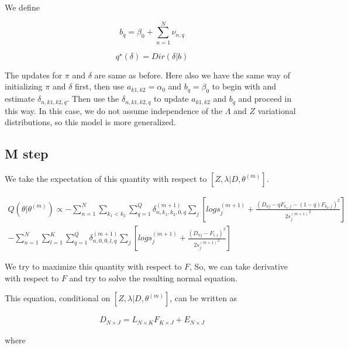 \documentclass[12pt]{article}
\begin{document}
We define 

$$ b_{q} = \beta_0 + \sum_{n=1}^{N} \nu_{n,q} $$

$$ q^{\star} (\delta) = Dir(\delta | b)  $$



The updates for $\pi$ and $\delta$ are same as before. Here also we have the same way of initializing $\pi$ and $\delta$ first, then use $a_{k1,k2}=\alpha_0$ and $b_{q}=\beta_0$ to begin with and estimate $\delta_{n,k1,k2,q}$. Then use the $\delta_{n,k1,k2,q}$ to update $a_{k1,k2}$ and $b_{q}$ and proceed in this way. In this case, we do not assume independence of the $\Lambda$ and $Z$ variational distributions, so this model is more generalized.



\subsection{M step}


%
%
%
%
We take the expectation of this quantity with respect to $\left [ Z, \lambda | D, \theta^{(m)} \right ]$.

\begin{eqnarray}
 Q (\theta | \theta^{(m)}) \propto - \sum_{n=1}^{N} \sum_{k_1 < k_2} \sum_{q=1}^{Q} \delta^{(m+1)}_{n, k_1, k_2, 0, q}  \sum_{j} \left [ log s^{(m+1)}_{j} + \frac{(D_{nj} - q F_{k_1,j} - (1-q) F_{k_2,j})^2}{2{s_j^{(m+1)}}^2} \right] \\
 -   \sum_{n=1}^{N} \sum_{l=1}^{K} \sum_{q=1}^{Q} \delta^{(m+1)}_{n, 0, 0, l, q}  \sum_{j} \left [ log s^{(m+1)}_{j} + \frac{(D_{nj} - F_{l,j})^2}{2{s_j^{(m+1)}}^2} \right] 
\end{eqnarray}

We try to maximize this quantity with respect to $F$, So, we can take derivative with respect to $F$ and try to solve the resulting normal equation.

This equation, conditional on $\left [ Z, \lambda | D, \theta^{(m)} \right ]$, can be written as 

\begin{eqnarray}
 D_{N \times J} = L_{N \times K} F_{K \times J} + E_{N \times J}
\end{eqnarray}

where 
\end{document}
